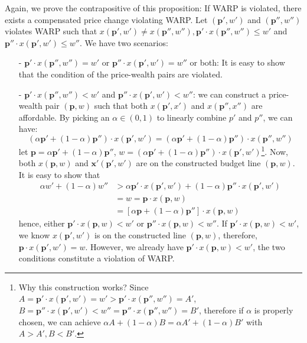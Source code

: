 \begin{description}
    Again, we prove the contrapositive of this proposition: If WARP is violated, there exists a compensated price change violating WARP. Let $(\mathbf{p}',w')$ and $(\mathbf{p}'',w'')$ violates WARP such that $ x(\mathbf{p}',w')\neq  x(\mathbf{p}'',w''),\mathbf{p}'\cdot x(\mathbf{p}'',w'')\leq w'$ and $\mathbf{p}''\cdot x(\mathbf{p}',w')\leq w''$. We have two scenarios:
    \begin{enumerate}
        \item[-] $\mathbf{p}'\cdot x(\mathbf{p}'',w'')= w'$ or $\mathbf{p}''\cdot x(\mathbf{p}',w')= w''$ or both: It is easy to show that the condition of the price-wealth pairs are violated.
        \item[-] $\mathbf{p}'\cdot x(\mathbf{p}'',w'')< w'$ and $\mathbf{p}''\cdot x(\mathbf{p}',w')<w''$: we can construct a price-wealth pair $(\mathbf{p},w)$ such that both $ x(\mathbf{p}',x')$ and $ x(\mathbf{p}'',x'')$ are affordable. By picking an $\alpha \in (0,1)$ to linearly combine $p'$ and $p''$, we can have:
        $$(\alpha \mathbf{p}'+(1-\alpha)\mathbf{p}'')\cdot  x(\mathbf{p}',w')= (\alpha \mathbf{p}'+(1-\alpha)\mathbf{p}'')\cdot  x(\mathbf{p}'',w'')$$
        let $\mathbf{p}=\alpha \mathbf{p}'+(1-\alpha)\mathbf{p}''$, $w=(\alpha \mathbf{p}'+(1-\alpha)\mathbf{p}'')\cdot  x(\mathbf{p}',w')$\footnote{Why this construction works? Since $A = \mathbf{p}'\cdot  x(\mathbf{p}',w')= w'> \mathbf{p}'\cdot  x(\mathbf{p}'',w'')=A'$, $B=\mathbf{p}''\cdot  x(\mathbf{p}',w')<w''= \mathbf{p}''\cdot  x(\mathbf{p}'',w'')=B'$, therefore if $\alpha$ is properly chosen, we can achieve $\alpha A+(1-\alpha)B = \alpha A'+(1-\alpha) B'$ with $A>A',B<B'$.}.
         Now, both $ x(\mathbf{p},w)$ and $\mathbf{x}'(\mathbf{p}',w')$ are on the constructed budget line $(\mathbf{p},w)$. It is easy to show that
        \begin{align*}
            \alpha w'+(1-\alpha)w'' &> \alpha \mathbf{p}'\cdot x(\mathbf{p}',w')+(1-\alpha) \mathbf{p}''\cdot  x(\mathbf{p}',w') \\
            & = w=\mathbf{p}\cdot  x(\mathbf{p},w)\\
            & = \left[ \alpha \mathbf{p}+(1-\alpha) \mathbf{p}''\right]\cdot  x(\mathbf{p},w)
        \end{align*}
        hence, either $\mathbf{p}'\cdot  x(\mathbf{p},w)<w'$ or $\mathbf{p}''\cdot  x(\mathbf{p},w)<w''$. If $\mathbf{p}'\cdot x(\mathbf{p},w)<w'$, we know $ x(\mathbf{p}',w')$ is on the constructed line $(\mathbf{p},w)$, therefore, $\mathbf{p}\cdot  x(\mathbf{p}',w')=w$. However, we already have $\mathbf{p}'\cdot  x(\mathbf{p},w)<w'$, the two conditions constitute a violation of WARP.
    \end{enumerate} 


\end{description}
